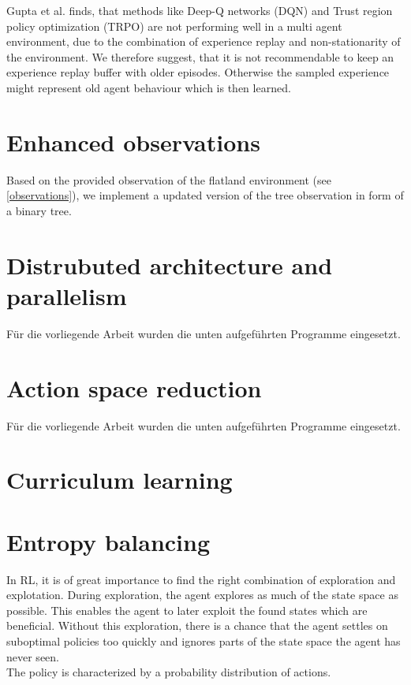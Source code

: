 Gupta et al. \cite{multiagent_comp_a3c_dqn_etc} finds, that methods like Deep-Q networks (DQN) and Trust region policy optimization (TRPO) are not performing well in a multi agent environment, due to the combination of experience replay and non-stationarity of the environment. We therefore suggest, that it is not recommendable to keep an experience replay buffer with older episodes. Otherwise the sampled experience might represent old agent behaviour which is then learned.

\section{Enhanced observations}\label{enhanced_observations}
Based on the provided observation of the flatland environment (see  \autoref{observations}), we implement a updated version of the tree observation in form of a binary tree. 

\section{Distrubuted architecture and parallelism}\label{dist_architecture}
Für die vorliegende Arbeit wurden die unten aufgeführten Programme eingesetzt.

\section{Action space reduction}\label{reduced_action_space}
Für die vorliegende Arbeit wurden die unten aufgeführten Programme eingesetzt.

\section{Curriculum learning}\label{curriculum_learning}


\section{Entropy balancing}\label{enhanced_observations}
In RL, it is of great importance to find the right combination of exploration and explotation. During exploration, the agent explores as much of the state space as possible. This enables the agent to later exploit the found states which are beneficial. Without this exploration, there is a chance that the agent settles on suboptimal policies too quickly and ignores parts of the state space the agent has never seen.\\
The policy is characterized by a probability distribution of actions.

